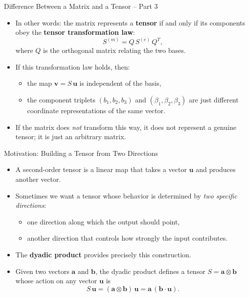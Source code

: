 \documentclass[aspectratio=169,11pt]{beamer}
\begin{document}
\begin{frame}{Difference Between a Matrix and a Tensor -- Part 3}

\begin{itemize}
    \item In other words: the matrix represents a \textbf{tensor} if and only if
          its components obey the \textbf{tensor transformation law}:
    \[
        S^{(m)} = Q\, S^{(e)}\, Q^{T},
    \]
    where $Q$ is the orthogonal matrix relating the two bases.
    \item If this transformation law holds, then:
    \begin{itemize}
        \item the map $\mathbf{v} = S\,\mathbf{u}$ is independent of the basis,
        \item the component triplets $(b_1,b_2,b_3)$ and $(\beta_1,\beta_2,\beta_3)$
              are just different coordinate representations of the same vector.
    \end{itemize}
    \item If the matrix does \emph{not} transform this way, it does not represent
          a genuine tensor; it is just an arbitrary matrix.
\end{itemize}
\end{frame}

\begin{frame}{Motivation: Building a Tensor from Two Directions}

\begin{itemize}

    \item A second-order tensor is a linear map that takes a vector
          $\mathbf{u}$ and produces another vector.

    \item Sometimes we want a tensor whose behavior is determined by
          \emph{two specific directions}: 
          \begin{itemize}
              \item one direction along which the output should point,
              \item another direction that controls how strongly the input
                    contributes.
          \end{itemize}

    \item The \textbf{dyadic product} provides precisely this construction.

    \item Given two vectors $\mathbf{a}$ and $\mathbf{b}$, the dyadic product
          defines a tensor $S = \mathbf{a} \otimes \mathbf{b}$ whose action on
          any vector $\mathbf{u}$ is
          \[
              S\,\mathbf{u}
              = (\mathbf{a} \otimes \mathbf{b})\,\mathbf{u}
              = \mathbf{a}\,(\mathbf{b} \cdot \mathbf{u}).
          \]
          \end{itemize}
\end{frame}
\end{document}
